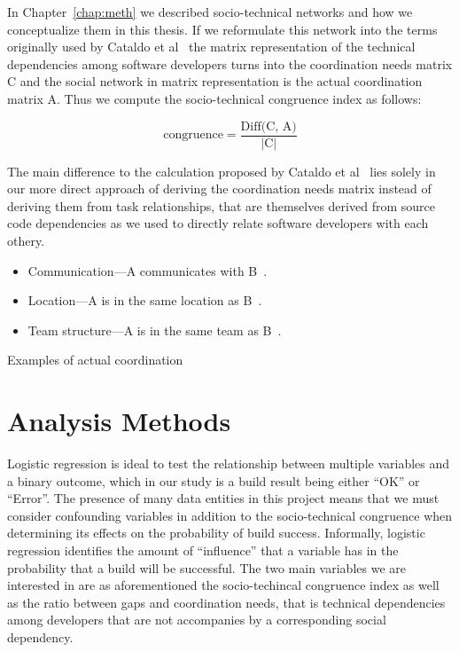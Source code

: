 %
In Chapter~\ref{chap:meth} we described socio-technical networks and how we conceptualize them in this thesis.
If we reformulate this network into the terms originally used by Cataldo et al~\cite{cataldo:cscw:2006} the matrix representation of the technical dependencies among software developers turns into the coordination needs matrix C and the social network in matrix representation is the actual coordination matrix A.
Thus we compute the socio-technical congruence index as follows:

\[ \text{congruence} = \frac{\text{Diff(C, A)}}  {|\text{C}|} \]

The main difference to the calculation proposed by Cataldo et al~\cite{cataldo:cscw:2006} lies solely in our more direct approach of deriving the coordination needs matrix instead of deriving them from task relationships, that are themselves derived from source code dependencies as we used to directly relate software developers with each othery.

\begin{placeholder}[t]
\begin{itemize}
\item Communication---A communicates with B~\cite{cataldo:cscw:2006, ehrlich:stc:2008, cataldo:esem:2008,damian2007:collaboration}.
\item Location---A is in the same location as B~\cite{cataldo:cscw:2006, ehrlich:stc:2008}.
\item Team structure---A is in the same team as B~\cite{cataldo:cscw:2006}.
\end{itemize}
\caption{Examples of actual coordination}
\label{ph:relationships}
\end{placeholder}


\section{Analysis Methods}
\label{sec:methodology}
Logistic regression is ideal to test the relationship between multiple variables and a binary outcome, which in our study is a build result being either ``OK'' or ``Error''. The presence of many data entities in this project means that we must consider confounding variables in addition to the socio-technical congruence when determining its effects on the probability of build success. Informally, logistic regression identifies the amount of ``influence'' that a variable has in the probability that a build will be successful.
The two main variables we are interested in are as aforementioned the socio-techincal congruence index as well as the ratio between gaps and coordination needs, that is technical dependencies among developers that are not accompanies by a corresponding social dependency.

